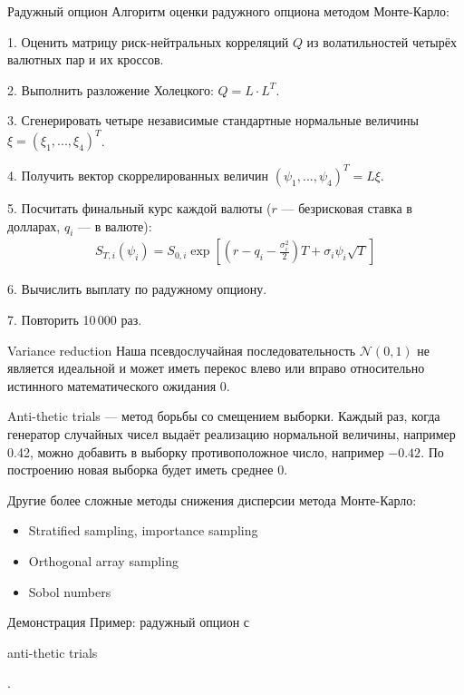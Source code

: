 \documentclass{beamer}
\newcommand{\en}[1]{\begin{otherlanguage}{english}#1\end{otherlanguage}}
\begin{document}
\begin{frame}{Радужный опцион}
\justify
Алгоритм оценки радужного опциона методом Монте-Карло:

1. Оценить матрицу риск-нейтральных корреляций $Q$ из волатильностей четырёх валютных пар и их кроссов.

2. Выполнить разложение Холецкого: $Q = L \cdot L^T$.

3. Сгенерировать четыре независимые стандартные нормальные величины $\xi = (\xi_1,...,\xi_4)^T$.

4. Получить вектор скоррелированных величин $(\psi_1,...,\psi_4)^T = L\xi$.

5. Посчитать финальный курс каждой валюты ($r$ --- безрисковая ставка в долларах, $q_i$ --- в валюте):
\begin{align*}
S_{T,i}(\psi_i) = S_{0,i}\exp\left[\left(r - q_i - \frac{\sigma_i^2}{2}\right)T + \sigma_i\psi_i\sqrt{T}\right]
\end{align*}

6. Вычислить выплату по радужному опциону.

7. Повторить 10\,000 раз.
\end{frame}



\begin{frame}{Variance reduction}
\justify
Наша псевдослучайная последовательность $\mathcal{N}(0,1)$ не является идеальной и может иметь перекос влево или вправо относительно истинного математического ожидания 0.

\justify
Anti-thetic trials --- метод борьбы со смещением выборки. Каждый раз, когда генератор случайных чисел выдаёт реализацию нормальной величины, например 0.42, можно добавить в выборку противоположное число, например $-0.42$. По построению новая выборка будет иметь среднее 0.

\justify
Другие более сложные методы снижения дисперсии метода Монте-Карло:
\begin{itemize}
\item Stratified sampling, importance sampling
\item Orthogonal array sampling
\item Sobol numbers
\end{itemize}
\end{frame}



\begin{frame}{Демонстрация}
\justify
Пример: радужный опцион с \en{anti-thetic trials}.
\end{frame}
\end{document}
